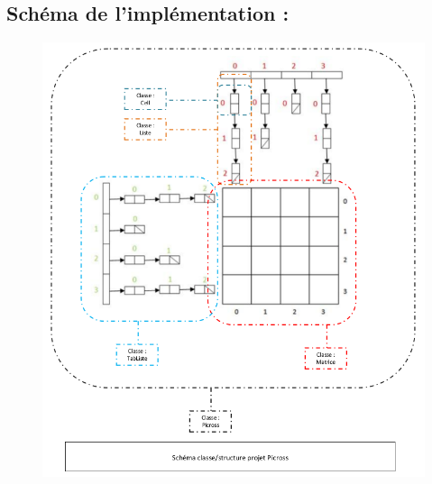 \documentclass{article}
\begin{document}
\subsection{Schéma de l'implémentation : }
\begin{landscape}
\begin{figure}
\begin{center}
\includegraphics[width=14cm]{./images/recapitulatif_stucture.png}
\end{center}
\end{figure}
\end{landscape}
\newpage
\end{document}
